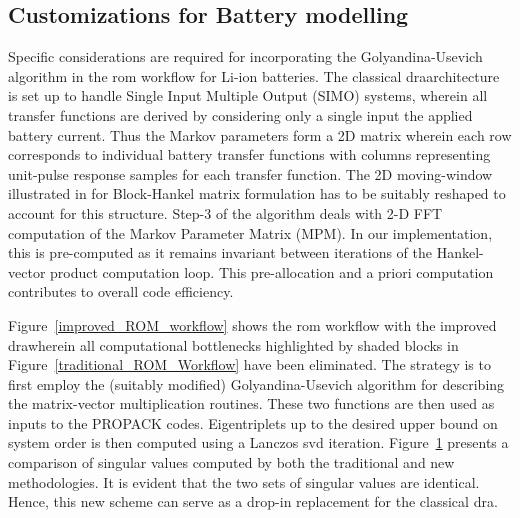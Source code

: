 
\begin{figure*}
	\caption{}
	\label{improved_ROM_workflow}
\end{figure*}

\subsection{Customizations for Battery modelling}

Specific considerations are required for incorporating the Golyandina-Usevich
algorithm in the \gls{rom} workflow for Li-ion batteries. The classical
\gls{dra}architecture is set up to handle Single Input Multiple Output
(SIMO) systems, wherein all transfer functions are derived by considering
only a single input \textendash{} the applied battery current. Thus
the Markov parameters form a 2D matrix wherein each row corresponds
to individual battery transfer functions with columns representing
unit-pulse response samples for each transfer function. The 2D moving-window
illustrated in \cite{GolyandinaKorobeynikovShlemovEtAl2015} for
Block-Hankel matrix formulation has to be suitably reshaped to account
for this structure. Step-3 of the algorithm deals with 2-D FFT computation
of the Markov Parameter Matrix (MPM). In our implementation, this
is pre-computed as it remains invariant between iterations of the
Hankel-vector product computation loop. This pre-allocation and a
priori computation contributes to overall code efficiency.

Figure~\ref{improved_ROM_workflow} shows the \gls{rom} workflow with
the improved \gls{dra}wherein all computational bottlenecks highlighted
by shaded blocks in Figure~\ref{traditional_ROM_Workflow} have
been eliminated. The strategy is to first employ the (suitably modified)
Golyandina-Usevich algorithm for describing the matrix-vector multiplication
routines. These two functions are then used as inputs to the PROPACK
codes. Eigentriplets up to the desired upper bound on system order
is then computed using a Lanczos \gls{svd} iteration. Figure~\ref{svdcompare}
presents a comparison of singular values computed by both the  traditional
and new methodologies. It is evident that the two sets of singular
values are identical. Hence, this new scheme can serve as a drop-in
replacement for the classical \gls{dra}.

\begin{figure}
	\caption{}
	\label{svdcompare}
\end{figure}


